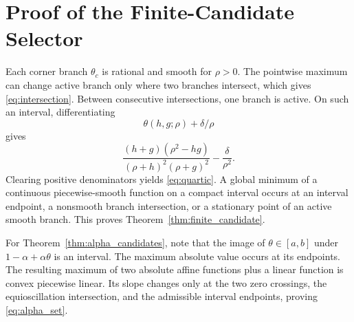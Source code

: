 \documentclass[pdflatex,iicol,sn-mathphys-num]{sn-jnl}
\theoremstyle{definition}\newtheorem{definition}[theorem]{Definition}\newtheorem{remark}[theorem]{Remark}
\begin{document}
\section{Proof of the Finite-Candidate Selector}\label{app:candidates}
Each corner branch $\theta_c$ is rational and smooth for $\rho>0$. The pointwise maximum can change active branch only where two branches intersect, which gives \eqref{eq:intersection}. Between consecutive intersections, one branch is active. On such an interval, differentiating
\[
\theta(h,g;\rho)+\delta/\rho
\]
gives
\[
\frac{(h+g)(\rho^2-hg)}{(\rho+h)^2(\rho+g)^2}-\frac{\delta}{\rho^2}.
\]
Clearing positive denominators yields \eqref{eq:quartic}. A global minimum of a continuous piecewise-smooth function on a compact interval occurs at an interval endpoint, a nonsmooth branch intersection, or a stationary point of an active smooth branch. This proves Theorem~\ref{thm:finite_candidate}.

For Theorem~\ref{thm:alpha_candidates}, note that the image of $\theta\in[a,b]$ under $1-\alpha+\alpha\theta$ is an interval. The maximum absolute value occurs at its endpoints. The resulting maximum of two absolute affine functions plus a linear function is convex piecewise linear. Its slope changes only at the two zero crossings, the equioscillation intersection, and the admissible interval endpoints, proving \eqref{eq:alpha_set}.
\end{document}
